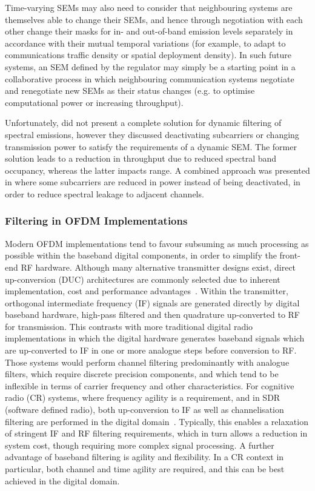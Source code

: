 Time-varying SEMs may also need to consider that neighbouring systems are themselves able to change their SEMs, and hence through negotiation with each other change their masks for in- and out-of-band emission levels separately in accordance with their mutual temporal variations (for example, to adapt to communications traffic density or spatial deployment density).
In such future systems, an SEM defined by the regulator may simply be a starting point in a collaborative process in which neighbouring communication systems negotiate and renegotiate new SEMs as their status changes (e.g. to optimise computational power or increasing throughput).

Unfortunately, \cite{Forde2010} did not present a complete solution for dynamic filtering of spectral emissions, however they discussed deactivating subcarriers or changing transmission power to satisfy the requirements of a dynamic SEM.
The former solution leads to a reduction in throughput due to reduced spectral band occupancy, whereas the latter impacts range.
A combined approach was presented in \cite{Kryszkiewicz2013} where some subcarriers are reduced in power instead of being deactivated, in order to reduce spectral leakage to adjacent channels.

\subsubsection{Filtering in OFDM Implementations}
\label{sec:how_ofdm_works}

Modern OFDM implementations tend to favour subsuming as much processing as possible within the baseband digital components, in order to simplify the front-end RF hardware.
Although many alternative transmitter designs exist, direct up-conversion (DUC) architectures are commonly selected due to inherent implementation, cost and performance advantages~\cite{masse2006direct}.
Within the transmitter, orthogonal intermediate frequency (IF) signals are generated directly by digital baseband hardware, high-pass filtered and then quadrature up-converted to RF for transmission.
This contrasts with more traditional digital radio implementations in which the digital hardware generates baseband signals which are up-converted to IF in one or more analogue steps before conversion to RF.
Those systems would perform channel filtering predominantly with analogue filters, which require discrete precision components, and which tend to be inflexible in terms of carrier frequency and other characteristics.
For cognitive radio (CR) systems, where frequency agility is a requirement, and in SDR (software defined radio), both up-conversion to IF as well as channelisation filtering are performed in the digital domain~\cite{Chen2005,Dowle2006}.
Typically, this enables a relaxation of stringent IF and RF filtering requirements, which in turn allows a reduction in system cost, though requiring more complex signal processing.
A further advantage of baseband filtering is agility and flexibility.
In a CR context in particular, both channel and time agility are required, and this can be best achieved in the digital domain.

